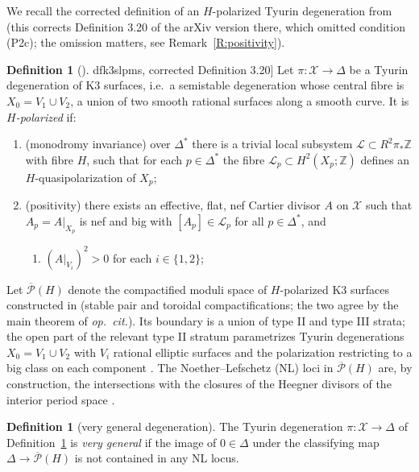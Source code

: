 \documentclass[11pt]{amsart}
\theoremstyle{plain}
\theoremstyle{definition}
\newtheorem{definition}[theorem]{Definition}
\theoremstyle{remark}
\numberwithin{equation}{section}
\begin{document}
We recall the corrected definition of an \(H\)-polarized Tyurin degeneration
from \cite{dfk3slpms} (this corrects Definition 3.20 of the arXiv version
there, which omitted condition (P2c); the omission matters, see
Remark~\ref{R:positivity}).

\begin{definition}[{\cite[\S 3]{dfk3slpms}, corrected Definition 3.20]
\label{D:H-pol-deg}
Let \(\pi\colon\mathcal X\to\Delta\) be a Tyurin degeneration of K3 surfaces,
i.e.\ a semistable degeneration whose central fibre is
\(X_{0}=V_{1}\cup V_{2}\), a union of two smooth rational surfaces along a
smooth curve. It is {\em \(H\)-polarized} if:
\begin{enumerate}
\item[(P1)] (monodromy invariance) over \(\Delta^{*}\) there is a trivial
local subsystem \(\mathcal L\subset R^{2}\pi_{*}\mathbb Z\) with fibre
\(H\), such that for each \(p\in\Delta^{*}\) the fibre
\(\mathcal L_{p}\subset H^{2}(X_{p};\mathbb Z)\) defines an
\(H\)-quasipolarization of \(X_{p}\);
\item[(P2)] (positivity) there exists an effective, flat, nef Cartier divisor
\(A\) on \(\mathcal X\) such that \(A_{p}=A|_{X_{p}}\) is nef and big with
\([A_{p}]\in\mathcal L_{p}\) for all \(p\in\Delta^{*}\), and
\begin{enumerate}
\item[(a)] \((A|_{V_{i}})^{2}>0\) for each \(i\in\{1,2\}\);
\end{enumerate}
\end{enumerate}
\end{definition}

Let \(\overline{\mathcal P}(H)\) denote the compactified moduli space of
\(H\)-polarized K3 surfaces constructed in \cite{cmek3sspt}
(stable pair and toroidal compactifications; the two agree by the main theorem
of \emph{op.\ cit.}). Its boundary is a union of type II and type III strata;
the open part of the relevant type II stratum parametrizes Tyurin degenerations
\(X_{0}=V_{1}\cup V_{2}\) with \(V_{i}\) rational elliptic surfaces and the
polarization restricting to a big class on each component
\cite[Main Theorems]{cmek3sspt}. The Noether--Lefschetz (NL) loci in
\(\overline{\mathcal P}(H)\) are, by construction, the intersections with the
closures of the Heegner divisors of the interior period space
\cite{cmek3sspt, dfk3slpms}.

\begin{definition}[very general degeneration]\label{D:very-general}
The Tyurin degeneration \(\pi\colon\mathcal X\to\Delta\) of
Definition~\ref{D:H-pol-deg} is {\em very general} if the image of
\(0\in\Delta\) under the classifying map \(\Delta\to\overline{\mathcal P}(H)\)
is not contained in any NL locus.
\end{definition}
\end{document}

